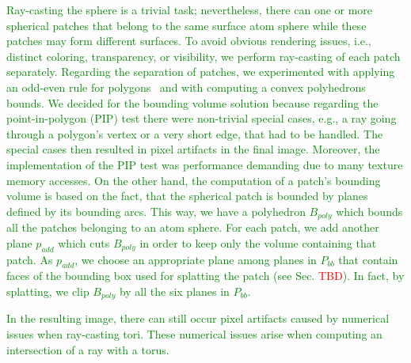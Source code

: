 \textcolor{green}{
Ray-casting the sphere is a trivial task; nevertheless, there can one or more spherical patches that belong to the same surface atom sphere while these patches may form different surfaces.
To avoid obvious rendering issues, i.e., distinct coloring, transparency, or visibility, we perform ray-casting of each patch separately.
Regarding the separation of patches, we experimented with applying an odd-even rule for polygons~\cite{shimrat1962algorithm} and with computing a convex polyhedrons bounds.
We decided for the bounding volume solution because regarding the point-in-polygon (PIP) test there were non-trivial special cases, e.g., a ray going through a polygon's vertex or a very short edge, that had to be handled.
The special cases then resulted in pixel artifacts in the final image.
Moreover, the implementation of the PIP test was performance demanding due to many texture memory accesses.
On the other hand, the computation of a patch's bounding volume is based on the fact, that the spherical patch is bounded by planes defined by its bounding arcs.
This way, we have a polyhedron $B_{poly}$ which bounds all the patches belonging to an atom sphere.
For each patch, we add another plane $p_{add}$ which cuts $B_{poly}$ in order to keep only the volume containing that patch.
As $p_{add}$, we choose an appropriate plane among planes in $P_{bb}$ that contain faces of the bounding box used for splatting the patch (see Sec. \textcolor{red}{TBD}).
In fact, by splatting, we clip $B_{poly}$ by all the six planes in $P_{bb}$.
}

\textcolor{green}{
In the resulting image, there can still occur pixel artifacts caused by numerical issues when ray-casting tori.
These numerical issues arise when computing an intersection of a ray with a torus.
}

